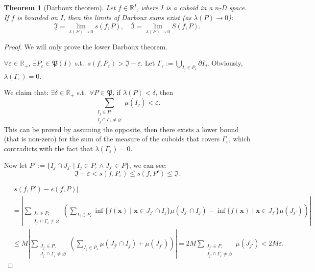 \documentclass[openany]{book}
\theoremstyle{plain}
\newtheorem{theorem}{Theorem}[section] %
\theoremstyle{definition}
\newcommand*{\bv}{\boldsymbol} %
\begin{document}
\begin{theorem}[Darboux theorem]
	\label{theorem: Darboux}
	Let $f \in \mathbb R^I$, where $I$ is a cuboid in a $n$-D space.
	If $f$ is bounded on $I$, then the limits of Darboux sums exist (as $\lambda(P) \to 0$):
	\begin{equation*}
		\underline{\mathfrak I} = \lim_{\lambda(P) \to 0} s(f, P),
		\quad
		\overline{\mathfrak I} = \lim_{\lambda(P) \to 0} S(f, P).
	\end{equation*}
\end{theorem}
\begin{proof}
	We will only prove the lower Darboux theorem.

	$\forall \varepsilon \in \mathbb R_+$, $\exists P_\varepsilon \in \mathfrak P(I)$ s.t.\ $s(f, P_\varepsilon) > \underline{\mathfrak I} - \varepsilon$.
	Let $\varGamma_\varepsilon := \bigcup_{I_j \in P_\varepsilon} \partial I_j$.
	Obviously, $\lambda(\varGamma_\varepsilon) = 0$.

	We claim that: $\exists \delta \in \mathbb R_+$ s.t.\ $\forall P \in \mathfrak P$, if $\lambda(P) < \delta$, then
	\begin{equation*}
		\sum_{\substack{I_j \in P;\\ I_j \cap \varGamma_\varepsilon \neq \varnothing}} \mu(I_j) < \varepsilon.
	\end{equation*}
	This can be proved by assuming the opposite, then there exists a lower bound (that is non-zero) for the sum of the measure of the cuboids that covers $\varGamma_\varepsilon$, which contradicts with the fact that $\lambda(\varGamma_\varepsilon) = 0$.

	Now let $P' := \{I_j \cap J_{j'} \mid I_j \in P_\varepsilon \wedge J_{j'} \in P\}$, we can see:
	\begin{equation*}
		\underline{\mathfrak I} - \varepsilon < s(f, P_\varepsilon) \leq s(f, P') \leq \underline{\mathfrak I}.
	\end{equation*}

	\begin{align*}
		&|s(f, P') - s(f, P)| 
		\\
		&= \left|
			\sum_{\substack{J_{j'} \in P,\\ J_{j'} \cap \varGamma_\varepsilon \neq \varnothing}}
				\left(
					\sum_{I_j \in P_\varepsilon} \inf\{f(\bv x)\mid \bv x \in J_{j'} \cap I_j\} \mu(J_{j'} \cap I_j)
					-
					\inf\{f(\bv x)\mid \bv x \in J_{j'}\} \mu(J_{j'})
				\right)
		\right|
		\\
		&\leq M \left|
		\sum_{\substack{J_{j'} \in P,\\ J_{j'} \cap \varGamma_\varepsilon \neq \varnothing}}
			\left(
				\sum_{I_j \in P_\varepsilon} \mu(J_{j'} \cap I_j)
				+ \mu(J_{j'})
			\right)
		\right|
		= 2M \sum_{\substack{J_{j'} \in P,\\ J_{j'} \cap \varGamma_\varepsilon \neq \varnothing}}\mu(J_{j'}) < 2M \varepsilon.
	\end{align*}


\end{proof}
\end{document}
